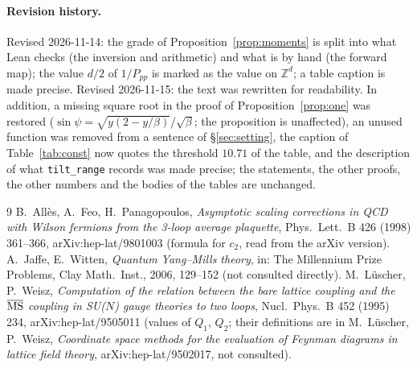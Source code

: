 \documentclass[11pt,a4paper]{article}
\theoremstyle{definition}
\theoremstyle{remark}
\newcommand{\code}[1]{\texttt{#1}}
\begin{document}
{\small
\paragraph{Revision history.} Revised 2026-11-14: the grade of Proposition~\ref{prop:moments} is split into what Lean checks (the inversion and arithmetic) and what is by hand (the forward map); the value $d/2$ of $1/P_{pp}$ is marked as the value on $\mathbb Z^d$; a table caption is made precise. Revised 2026-11-15: the text was rewritten for readability. In addition, a missing square root in the proof of Proposition~\ref{prop:one} was restored ($\sin\psi=\sqrt{y(2-y/\beta)}/\sqrt\beta$; the proposition is unaffected), an unused function was removed from a sentence of \S\ref{sec:setting}, the caption of Table~\ref{tab:const} now quotes the threshold $10.71$ of the table, and the description of what \code{tilt\_range} records was made precise; the statements, the other proofs, the other numbers and the bodies of the tables are unchanged.

\begin{thebibliography}{9}
 B.~Allès, A.~Feo, H.~Panagopoulos, \emph{Asymptotic scaling corrections in QCD with Wilson fermions from the 3-loop average plaquette}, Phys.\ Lett.\ B 426 (1998) 361--366, arXiv:hep-lat/9801003 (formula for $c_2$, read from the arXiv version).
 A.~Jaffe, E.~Witten, \emph{Quantum Yang--Mills theory}, in: The Millennium Prize Problems, Clay Math.\ Inst., 2006, 129--152 (not consulted directly).
 M.~Lüscher, P.~Weisz, \emph{Computation of the relation between the bare lattice coupling and the $\overline{\rm MS}$ coupling in SU($N$) gauge theories to two loops}, Nucl.\ Phys.\ B 452 (1995) 234, arXiv:hep-lat/9505011 (values of $Q_1$, $Q_2$; their definitions are in M.~Lüscher, P.~Weisz, \emph{Coordinate space methods for the evaluation of Feynman diagrams in lattice field theory}, arXiv:hep-lat/9502017, not consulted).
\end{thebibliography}}
\end{document}

